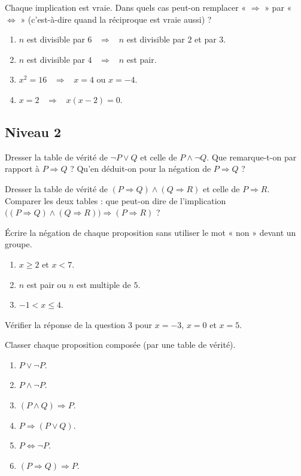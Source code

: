 \begin{exercise}
Chaque implication est vraie. Dans quels cas peut-on remplacer « $\Rightarrow$ » par « $\Leftrightarrow$ » (c'est-à-dire quand la réciproque est vraie aussi) ?
\begin{enumerate}
\item $n$ est divisible par $6$ \ $\Rightarrow$ \ $n$ est divisible par $2$ et par $3$.
\item $n$ est divisible par $4$ \ $\Rightarrow$ \ $n$ est pair.
\item $x^2=16$ \ $\Rightarrow$ \ $x=4$ ou $x=-4$.
\item $x=2$ \ $\Rightarrow$ \ $x(x-2)=0$.
\end{enumerate}
\end{exercise}
\subsection*{Niveau 2}
\begin{exercise}
Dresser la table de vérité de $\lnot P\lor Q$ et celle de $P\land\lnot Q$. Que remarque-t-on par rapport à $P\Rightarrow Q$ ? Qu'en déduit-on pour la négation de $P\Rightarrow Q$ ?
\end{exercise}
\begin{exercise}
Dresser la table de vérité de $(P\Rightarrow Q)\land(Q\Rightarrow R)$ et celle de $P\Rightarrow R$. Comparer les deux tables : que peut-on dire de l'implication $\bigl((P\Rightarrow Q)\land(Q\Rightarrow R)\bigr)\Rightarrow(P\Rightarrow R)$ ?
\end{exercise}
\begin{exercise}
Écrire la négation de chaque proposition sans utiliser le mot « non » devant un groupe.
\begin{enumerate}
\item $x\ge2$ et $x<7$.
\item $n$ est pair ou $n$ est multiple de $5$.
\item $-1<x\le4$.
\end{enumerate}
Vérifier la réponse de la question 3 pour $x=-3$, $x=0$ et $x=5$.
\end{exercise}
\begin{exercise}
Classer chaque proposition composée (par une table de vérité).
\begin{enumerate}
\item $P\lor\lnot P$.
\item $P\land\lnot P$.
\item $(P\land Q)\Rightarrow P$.
\item $P\Rightarrow(P\lor Q)$.
\item $P\Leftrightarrow\lnot P$.
\item $(P\Rightarrow Q)\Rightarrow P$.
\end{enumerate}
\end{exercise}
